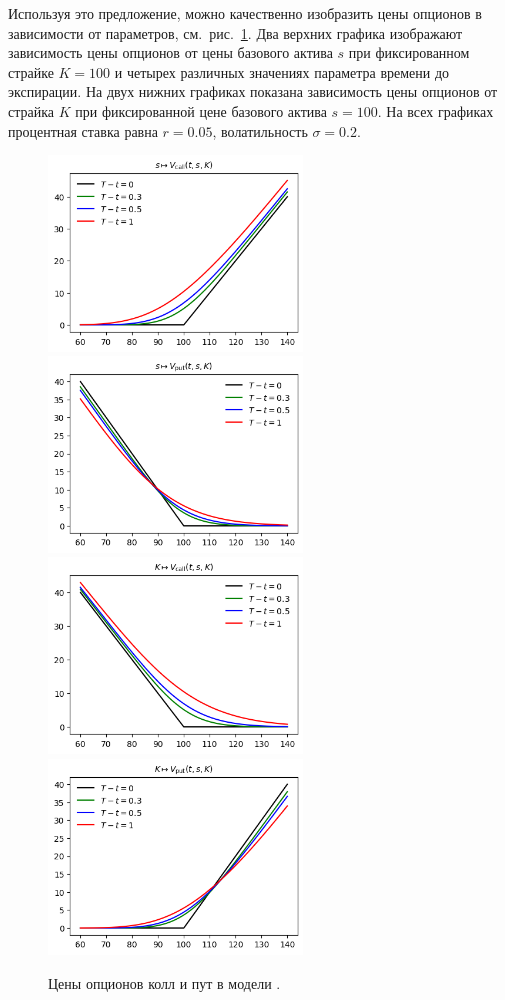 Используя это предложение, можно качественно изобразить цены опционов в зависимости от параметров, см.~рис.~\ref{9:f:bs}.
Два верхних графика изображают зависимость цены опционов от цены базового актива $s$ при фиксированном страйке $K=100$ и четырех различных значениях параметра времени до экспирации.
На двух нижних графиках показана зависимость цены опционов от страйка $K$ при фиксированной цене базового актива $s=100$.
На всех графиках процентная ставка равна $r=0.05$, волатильность $\sigma=0.2$.

\begin{figure}[h]
\centering
\includegraphics[height=5.2cm]{pic/callprice-s.png}\qquad
\includegraphics[height=5.2cm]{pic/putprice-s.png}\\
\includegraphics[height=5.2cm]{pic/callprice-k.png}\qquad
\includegraphics[height=5.2cm]{pic/putprice-k.png}
\caption{Цены опционов колл и пут в модели \bs.}
\label{9:f:bs}
\end{figure}


